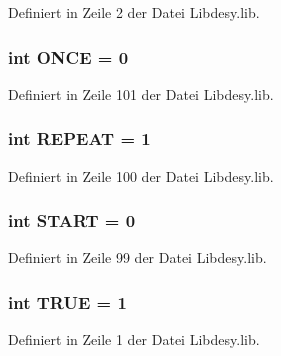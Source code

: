 Definiert in Zeile 2 der Datei Libdesy.\+lib.

\hypertarget{_libdesy_8lib_a33c37d62e812c5904ca88faa88d0c57c}{}
\subsubsection[{O\+N\+C\+E}]{\setlength{\rightskip}{0pt plus 5cm}int O\+N\+C\+E = 0}\label{_libdesy_8lib_a33c37d62e812c5904ca88faa88d0c57c}


Definiert in Zeile 101 der Datei Libdesy.\+lib.

\hypertarget{_libdesy_8lib_ad5ddb2044ab034a83c0735668b613a8b}{}
\subsubsection[{R\+E\+P\+E\+A\+T}]{\setlength{\rightskip}{0pt plus 5cm}int R\+E\+P\+E\+A\+T = 1}\label{_libdesy_8lib_ad5ddb2044ab034a83c0735668b613a8b}


Definiert in Zeile 100 der Datei Libdesy.\+lib.

\hypertarget{_libdesy_8lib_aac4fa8c481d4f1b3cf43b93b2165b1b4}{}
\subsubsection[{S\+T\+A\+R\+T}]{\setlength{\rightskip}{0pt plus 5cm}int S\+T\+A\+R\+T = 0}\label{_libdesy_8lib_aac4fa8c481d4f1b3cf43b93b2165b1b4}


Definiert in Zeile 99 der Datei Libdesy.\+lib.

\hypertarget{_libdesy_8lib_a8f0035a68b57201cc8c350ec72928325}{}
\subsubsection[{T\+R\+U\+E}]{\setlength{\rightskip}{0pt plus 5cm}int T\+R\+U\+E = 1}\label{_libdesy_8lib_a8f0035a68b57201cc8c350ec72928325}


Definiert in Zeile 1 der Datei Libdesy.\+lib.


